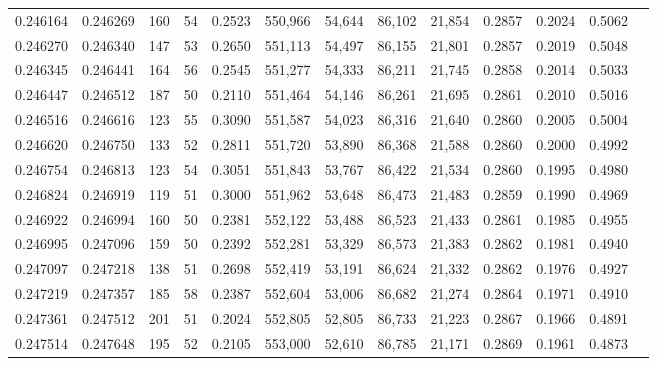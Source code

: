 \begin{tabular}{rrrrrrrrrrrrr}
0.246164 & 0.246269 &   160 &  54 &                                     0.2523 & 550,966 &  54,644 &  86,102 &  21,854 & 0.2857 & 0.2024 & 0.5062 \\
0.246270 & 0.246340 &   147 &  53 &                                     0.2650 & 551,113 &  54,497 &  86,155 &  21,801 & 0.2857 & 0.2019 & 0.5048 \\
0.246345 & 0.246441 &   164 &  56 &                                     0.2545 & 551,277 &  54,333 &  86,211 &  21,745 & 0.2858 & 0.2014 & 0.5033 \\
0.246447 & 0.246512 &   187 &  50 &                                     0.2110 & 551,464 &  54,146 &  86,261 &  21,695 & 0.2861 & 0.2010 & 0.5016 \\
0.246516 & 0.246616 &   123 &  55 &                                     0.3090 & 551,587 &  54,023 &  86,316 &  21,640 & 0.2860 & 0.2005 & 0.5004 \\
0.246620 & 0.246750 &   133 &  52 &                                     0.2811 & 551,720 &  53,890 &  86,368 &  21,588 & 0.2860 & 0.2000 & 0.4992 \\
0.246754 & 0.246813 &   123 &  54 &                                     0.3051 & 551,843 &  53,767 &  86,422 &  21,534 & 0.2860 & 0.1995 & 0.4980 \\
0.246824 & 0.246919 &   119 &  51 &                                     0.3000 & 551,962 &  53,648 &  86,473 &  21,483 & 0.2859 & 0.1990 & 0.4969 \\
0.246922 & 0.246994 &   160 &  50 &                                     0.2381 & 552,122 &  53,488 &  86,523 &  21,433 & 0.2861 & 0.1985 & 0.4955 \\
0.246995 & 0.247096 &   159 &  50 &                                     0.2392 & 552,281 &  53,329 &  86,573 &  21,383 & 0.2862 & 0.1981 & 0.4940 \\
0.247097 & 0.247218 &   138 &  51 &                                     0.2698 & 552,419 &  53,191 &  86,624 &  21,332 & 0.2862 & 0.1976 & 0.4927 \\
0.247219 & 0.247357 &   185 &  58 &                                     0.2387 & 552,604 &  53,006 &  86,682 &  21,274 & 0.2864 & 0.1971 & 0.4910 \\
0.247361 & 0.247512 &   201 &  51 &                                     0.2024 & 552,805 &  52,805 &  86,733 &  21,223 & 0.2867 & 0.1966 & 0.4891 \\
0.247514 & 0.247648 &   195 &  52 &                                     0.2105 & 553,000 &  52,610 &  86,785 &  21,171 & 0.2869 & 0.1961 & 0.4873 \\

\end{tabular}
